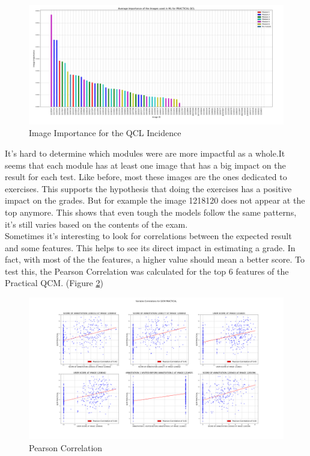 \documentclass[a4paper,11pt]{report}
\numberwithin{figure}{section} %
\begin{document}
      \begin{figure}[H]
      \centering
      \includegraphics[width=.95\linewidth]{im_importance_PRACTICAL_QCL_2018-04-29_14_33_48.png}
      \caption{Image Importance for the QCL Incidence}
      \label{fig:im_tp4}
      \end{figure}

	It's hard to determine which modules were are more impactful as a whole.It seems that each module has at least one image that has a big impact on the result for each test. Like before, most these images are the ones dedicated to exercises. This supports the hypothesis that doing the exercises has a positive impact on the grades. But for example the image 1218120 does not appear at the top anymore. This shows that even tough the models follow the same patterns, it's still varies based on the contents of the exam.\\
    
    Sometimes it's interesting  to look for correlations between the expected result and some features. This helps to see its direct impact in estimating a grade. In fact, with most of the the features, a higher value should mean a better score. To test this, the Pearson Correlation was calculated for the top 6 features of the Practical QCM. (Figure \ref{fig:corr_tp})
      \begin{figure}[H]
      \centering
      \includegraphics[width=.95\linewidth]{var_correlation_QCM_PRACTICAL_2018-04-29_14_38_14.png}
      \caption{Pearson Correlation}
      \label{fig:corr_tp}
      \end{figure}
    
\end{document}
